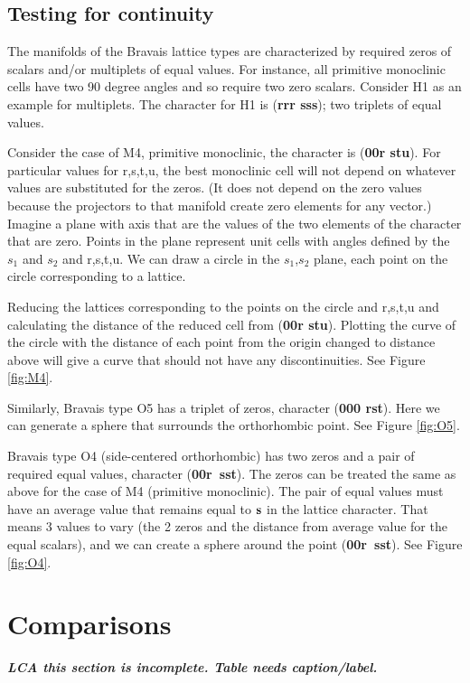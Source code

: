 \documentclass[preprint]{iucr}              %
\newcommand{\scalarsub}[2]{$#1_#2$}
\newcommand{\charseq}[1]{({\bf #1})}
\begin{document}
	\subsection{Testing for continuity}
	
	The manifolds of the Bravais lattice types are characterized by required zeros
	of scalars and/or multiplets of equal values. For instance, all primitive 
	monoclinic cells have two 90 degree angles and so require two zero scalars. Consider H1 as
	an example for multiplets. The character for H1 is \charseq{rrr sss}; two triplets of equal values.
	
	Consider the case of M4, primitive monoclinic, the character is \charseq{00r stu}. 
	For particular values for r,s,t,u, the best monoclinic cell will not
	depend on whatever values are substituted for the zeros. (It does not depend on the zero values because the projectors to that 
	manifold create zero elements for any vector.) Imagine a plane
	with axis that are the values of the two elements of the character that are zero. Points in the plane represent unit 
	cells with angles defined by the \scalarsub{s}{1} and \scalarsub{s}{2} and r,s,t,u. We can draw a circle in the
	\scalarsub{s}{1},\scalarsub{s}{2} plane, each point
	on the circle corresponding to a lattice. 
	
	Reducing the lattices corresponding to the points on the
	circle and r,s,t,u and calculating
	the distance of the reduced cell from \charseq{00r stu}.
	Plotting the curve of the circle with the distance of
	each point from the origin changed to distance above
	 will give a curve that
	should not have any discontinuities. See Figure \ref{fig:M4}. 
	
	Similarly, Bravais type O5 has a triplet of zeros, character \charseq{000 rst}. Here we
	can generate a sphere that surrounds the orthorhombic point. See Figure \ref{fig:O5}.
	
	Bravais type O4 (side-centered orthorhombic) has two zeros and a pair of required equal values, 
character \charseq{00r~sst}. The zeros can be treated the same as above
for the case of M4 (primitive monoclinic). 
	The pair of equal values must 
	have an average value that remains equal to $\bf{s}$ in the lattice character. 
	That means 3 values to vary (the 2 zeros and the distance from average
	value for the equal scalars), and we can create a sphere around 
	the point \charseq{00r~sst}. See Figure \ref{fig:O4}.
	
	
	
	\section{Comparisons}
	\textit{\textbf{LCA this section is incomplete. Table needs caption/label.}}
\end{document}
